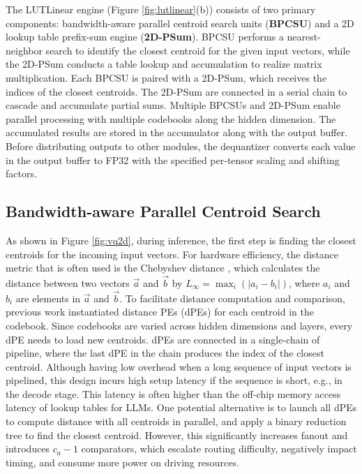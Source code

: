 \documentclass[conference]{IEEEtran}
\begin{document}
The LUTLinear engine (Figure \ref{fig:lutlinear}(b)) consists of two primary components: bandwidth-aware parallel centroid search units (\textbf{BPCSU}) and a 2D lookup table prefix-sum engine (\textbf{2D-PSum}). BPCSU performs a nearest-neighbor search to identify the closest centroid for the given input vectors, while the 2D-PSum conducts a table lookup and accumulation to realize matrix multiplication. Each BPCSU is paired with a 2D-PSum, which receives the indices of the closest centroids. The 2D-PSum are connected in a serial chain to cascade and accumulate partial sums. Multiple BPCSUs and 2D-PSum enable parallel processing with multiple codebooks along the hidden dimension. The accumulated results are stored in the accumulator along with the output buffer. Before distributing outputs to other modules, the dequantizer converts each value in the output buffer to FP32 with the specified per-tensor scaling and shifting factors.

\subsection{Bandwidth-aware Parallel Centroid Search}

As shown in Figure \ref{fig:vq2d}, during inference, the first step is finding the closest centroids for the incoming input vectors. For hardware efficiency, the distance metric that is often used is the Chebyshev distance \cite{cantrell2000modern}, which calculates the distance between two vectors $\vec{a}$ and $\vec{b}$ by $L_\infty = \max_i (|a_i - b_i|)$, where $a_i$ and $b_i$ are elements in $\vec{a}$ and $\vec{b}$. To facilitate distance computation and comparison, previous work \cite{li2025lut, wei2025t} instantiated distance PEs (dPEs) for each centroid in the codebook. Since codebooks are varied across hidden dimensions and layers, every dPE needs to load new centroids. dPEs are connected in a single-chain of pipeline, where the last dPE in the chain produces the index of the closest centroid. Although having low overhead when a long sequence of input vectors is pipelined, this design incurs high setup latency if the sequence is short, e.g., in the decode stage. This latency is often higher than the off-chip memory access latency of lookup tables for LLMs. One potential alternative is to launch all dPEs to compute distance with all centroids in parallel, and apply a binary reduction tree to find the closest centroid. However, this significantly increases fanout and introduces $c_a-1$ comparators, which escalate routing difficulty, negatively impact timing, and consume more power on driving resources.
\end{document}
